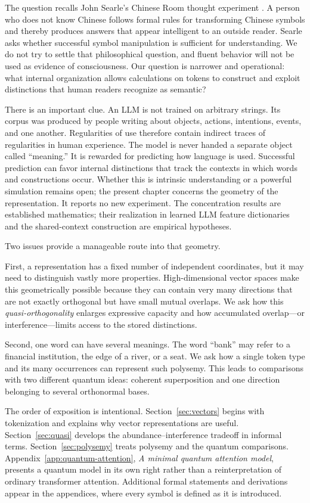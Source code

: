 \documentclass[
  aps,
  reprint,
  superscriptaddress,
  floatfix,
  nofootinbib,
  longbibliography
]{revtex4-2}
\begin{document}
The question recalls John Searle's Chinese Room thought experiment
\cite{searl-80a}.  A person who does not know Chinese follows formal rules for
transforming Chinese symbols and thereby produces answers that appear
intelligent to an outside reader.  Searle asks whether successful symbol
manipulation is sufficient for understanding.  We do not try to settle that
philosophical question, and fluent behavior will not be used as evidence of
consciousness.  Our question is narrower and operational: what internal
organization allows calculations on tokens to construct and exploit distinctions that
human readers recognize as semantic?

There is an important clue.  An LLM is not trained on arbitrary strings.
Its corpus was produced by people writing about objects, actions, intentions,
events, and one another.  Regularities of use therefore contain indirect
traces of regularities in human experience.  The model is never handed a
separate object called ``meaning.''  It is rewarded for predicting how
language is used.  Successful prediction can favor internal distinctions that
track the contexts in which words and constructions occur.  Whether this is
intrinsic understanding or a powerful simulation remains open; the present
chapter concerns the geometry of the representation.  It reports no new
experiment.  The concentration results are established mathematics; their
realization in learned LLM feature dictionaries and the shared-context
construction are empirical hypotheses.

Two issues provide a manageable route into that geometry.

First, a representation has a fixed number of independent coordinates, but it
may need to distinguish vastly more properties.  High-dimensional vector
spaces make this geometrically possible because they can contain very many directions that
are not exactly orthogonal but have small mutual overlaps.  We ask how this
\emph{quasi-orthogonality} enlarges expressive capacity and how accumulated
overlap---or interference---limits access to the stored distinctions.

Second, one word can have several meanings.  The word ``bank'' may refer to a
financial institution, the edge of a river, or a seat.  We ask how a single
token type and its many occurrences can represent such polysemy.  This leads
to comparisons with two different quantum ideas: coherent superposition and
one direction belonging to several orthonormal bases.

The order of exposition is intentional.  Section~\ref{sec:vectors} begins
with tokenization and explains why vector representations are useful.
Section~\ref{sec:quasi} develops the abundance--interference tradeoff in
informal terms.  Section~\ref{sec:polysemy} treats polysemy and the quantum
comparisons.  Appendix~\ref{app:quantum-attention}, \emph{A minimal quantum
attention model}, presents a quantum model in its own right rather than a
reinterpretation of ordinary transformer attention.  Additional formal
statements and derivations appear in the
appendices, where every symbol is defined as it is introduced.
\end{document}
